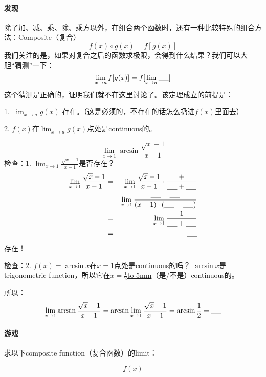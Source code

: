 \documentclass[UTF8]{ctexart}
\begin{document}
\paragraph{发现}
除了加、减、乘、除、乘方以外，在组合两个函数时，还有一种比较特殊的组合方法：Composite（复合）
\[f(x) \circ g(x) = f[g(x)]\]
我们关注的是，如果对复合之后的函数求极限，会得到什么结果？我们可以大胆“猜测”一下：
\[{\lim_{x \to a}f[g(x)] }= f[{\lim_{x \to a} \underline{\hbox to 5mm{}}}] \]
这个猜测是正确的，证明我们就不在这里讨论了。该定理成立的前提是：

1. ${\lim_{x \to a} g(x)}$ 存在。（这是必须的，不存在的话怎么扔进$f(x)$里面去）

2. $f(x)$在${\lim_{x \to a} g(x)}$点处是continuous的。

\[{\lim_{x \to 1} \arcsin{\frac{\sqrt{x} - 1}{ x - 1}}}\]
检查：1. ${\lim_{x \to 1} \frac{\sqrt{x} - 1}{ x - 1}}$是否存在？
\begin{eqnarray*}
{\lim_{x \to 1} \frac{\sqrt{x} - 1}{ x - 1}} & = & {\lim_{x \to 1} \frac{\sqrt{x} - 1}{ x - 1} \cdot \frac{\underline{\hbox to 5mm{}} + \underline{\hbox to 5mm{}}}{\underline{\hbox to 5mm{}} + \underline{\hbox to 5mm{}}}}  \\
& = & {\lim_{x \to 1} \frac{\underline{\hbox to 5mm{}}-\underline{\hbox to 5mm{}}}{(x-1) \cdot (\underline{\hbox to 5mm{}}+\underline{\hbox to 5mm{}}) }} \\
& = & {\lim_{x \to 1} \frac{1}{\underline{\hbox to 5mm{}}+\underline{\hbox to 5mm{}}}}\\
& = & \underline{\hbox to 5mm{}}
\end{eqnarray*} 
存在！

检查：2. $f(x) = \arcsin{x}$在$x = 1$点处是continuous的吗？
$\arcsin{x}$是trigonometric function，所以它在$x = \frac{1}{2}$\underline{\hbox to 5mm{}}（是/不是）continuous的。

所以：\[{\lim_{x \to 1} \arcsin{\frac{\sqrt{x} - 1}{ x - 1}}} = \arcsin{{\lim_{x \to 1} \frac{\sqrt{x} - 1}{ x - 1}}} = \arcsin{\frac{1}{2}} =\underline{\hbox to 5mm{}}\]

\paragraph{游戏}
求以下composite function（复合函数）的limit：
\begin{center}
\[f(x)\]
\end{center}
\end{document}
